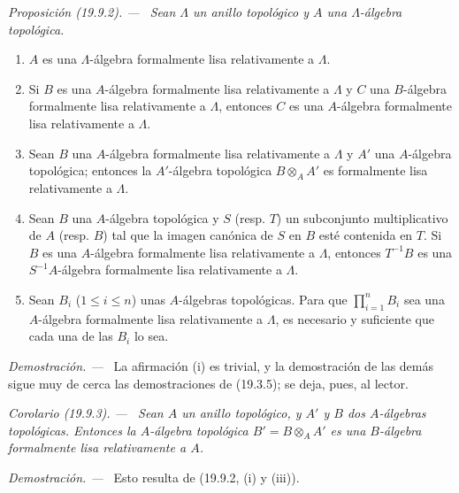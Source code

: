 \documentclass[10pt,oneside]{book}
\makeatletter
\newcommand{\setmanualcurrentlabel}[1]{\def\@currentlabel{#1}}
\newenvironment{proposition}[1][]{%
  \setmanualcurrentlabel{#1}\par\medskip\noindent\itshape Proposición (#1). ---\ }{\par}
\newenvironment{corollary}[1][]{%
  \setmanualcurrentlabel{#1}\par\medskip\noindent\itshape Corolario (#1). ---\ }{\par}
\newenvironment{proof}{%
  \par\medskip\noindent\textit{Demostración. ---\ }}{\par}
\makeatother
\begin{document}
\begin{proposition}[19.9.2]
\label{0.19.9.2-es}
Sean $\Lambda$ un anillo topológico y $A$ una $\Lambda$-álgebra topológica.
\begin{enumerate}
  \item[\textup{(i)}] $A$ es una $\Lambda$-álgebra formalmente lisa relativamente a
  $\Lambda$.
  \item[\textup{(ii)}] Si $B$ es una $A$-álgebra formalmente lisa relativamente a
  $\Lambda$ y $C$ una $B$-álgebra formalmente lisa relativamente a $\Lambda$,
  entonces $C$ es una $A$-álgebra formalmente lisa relativamente a $\Lambda$.
  \item[\textup{(iii)}] Sean $B$ una $A$-álgebra formalmente lisa relativamente a
  $\Lambda$ y $A'$ una $A$-álgebra topológica; entonces la $A'$-álgebra
  topológica $B\otimes_A A'$ es formalmente lisa relativamente a $\Lambda$.
  \item[\textup{(iv)}] Sean $B$ una $A$-álgebra topológica y $S$ \textup{(resp. $T$)} un
  subconjunto multiplicativo de $A$ \textup{(resp. $B$)} tal que la imagen canónica de
  $S$ en $B$ esté contenida en $T$. Si $B$ es una $A$-álgebra formalmente lisa
  relativamente a $\Lambda$, entonces $T^{-1}B$ es una $S^{-1}A$-álgebra
  formalmente lisa relativamente a $\Lambda$.
  \item[\textup{(v)}] Sean $B_i$ ($1\leq i\leq n$) unas $A$-álgebras topológicas. Para
  que $\prod_{i=1}^n B_i$ sea una $A$-álgebra formalmente lisa relativamente a
  $\Lambda$, es necesario y suficiente que cada una de las $B_i$ lo sea.
\end{enumerate}
\end{proposition}

\begin{proof}
La afirmación (i) es trivial, y la demostración de las demás sigue muy de cerca
las demostraciones de (19.3.5); se deja, pues, al lector.
\end{proof}

\begin{corollary}[19.9.3]
\label{0.19.9.3-es}
Sean $A$ un anillo topológico, y $A'$ y $B$ dos $A$-álgebras topológicas.
Entonces la $A$-álgebra topológica $B'=B\otimes_A A'$ es una $B$-álgebra
formalmente lisa relativamente a $A$.
\end{corollary}

\begin{proof}
Esto resulta de (19.9.2, (i) y (iii)).
\end{proof}
\end{document}
